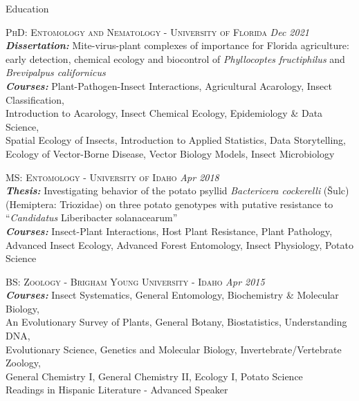 \documentclass{resume} %
\begin{document}
\begin{rSection}{Education}
	
	\textsc{PhD: Entomology and Nematology - University of Florida} \hfill {\em Dec 2021}\\
	\textit{\textbf{Dissertation:}} Mite-virus-plant complexes of importance for Florida agriculture: early detection, chemical ecology and biocontrol of \textit{Phyllocoptes fructiphilus} and \textit{Brevipalpus californicus} \\
	\textit{\textbf{Courses:}} Plant-Pathogen-Insect Interactions, Agricultural Acarology, Insect Classification,\\
	Introduction to Acarology, Insect Chemical Ecology, Epidemiology \& Data Science,\\
	Spatial Ecology of Insects, Introduction to Applied Statistics, Data Storytelling,\\
	Ecology of Vector-Borne Disease, Vector Biology Models, Insect Microbiology\\ \hfill
	
	\textsc{MS: Entomology - University of Idaho} \hfill {\em Apr 2018}\\
	\textit{\textbf{Thesis:}} Investigating behavior of the potato psyllid \textit{Bactericera cockerelli} (Šulc)\\
	(Hemiptera: Triozidae) on three potato genotypes with putative resistance to\\ “\textit{Candidatus} Liberibacter solanacearum”\\
	\textit{\textbf{Courses:}} Insect-Plant Interactions, Host Plant Resistance, Plant Pathology, Advanced Insect Ecology, Advanced Forest Entomology, Insect Physiology, Potato Science\\ \hfill
	
	\textsc{BS: Zoology - Brigham Young University - Idaho} \hfill {\em Apr 2015}\\ \textit{\textbf{Courses:}} Insect Systematics, General Entomology, Biochemistry \& Molecular Biology,\\
	An Evolutionary Survey of Plants, General Botany, Biostatistics, Understanding DNA,\\
	Evolutionary Science, Genetics and Molecular Biology, Invertebrate/Vertebrate Zoology,\\
	General Chemistry I, General Chemistry II,  Ecology I, Potato Science\\
	Readings in Hispanic Literature - Advanced Speaker\\ \hfill
	
\end{rSection}
\end{document}
